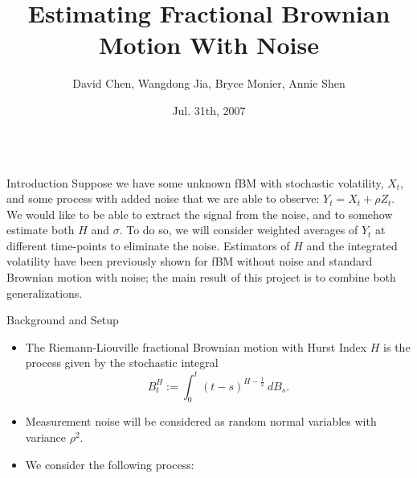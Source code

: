\documentclass[final,hyperref={pdfpagelabels=false}]{beamer}
\title[fBM Estimation Under Noise]{Estimating Fractional Brownian Motion With Noise}
\author[Chen & Jia & Monier & Shen]{David Chen, Wangdong Jia, Bryce Monier, Annie Shen}
\institute[Columbia University]{Columbia Math Undergraduate Summer Research Program}
\date{Jul. 31th, 2007}
\begin{document}
  \begin{frame}{} 
    \vfill
    \begin{columns}[t]
      \begin{column}{0.28\linewidth}
        \begin{block}{Introduction}
          Suppose we have some unknown fBM with stochastic volatility, \(X_t\), and some process with added noise that we are able to observe: \(Y_t = X_t + \rho Z_t\).  We would like to be able to extract the signal from the noise, and to somehow estimate both \(H\) and \(\sigma\). To do so, we will consider weighted averages of \(Y_t\) at different time-points to eliminate the noise. Estimators of \(H\) and the integrated volatility have been previously shown for fBM without noise and standard Brownian motion with noise; the main result of this project is to combine both generalizations.
        \end{block}
        \begin{block}{Background and Setup}
          \begin{itemize}
            \item The Riemann-Liouville fractional Brownian motion with Hurst Index \(H\) is the process given by the stochastic integral
              \[
                B^H_t := \int_0^t (t-s)^{H - \frac{1}{2}} \ dB_s.
              \]
            \item Measurement noise will be considered as random normal variables with variance \(\rho^2\).
            \item We consider the following process:

\end{itemize}
\end{block}
\end{column}
\end{columns}
\end{frame}
\end{document}
